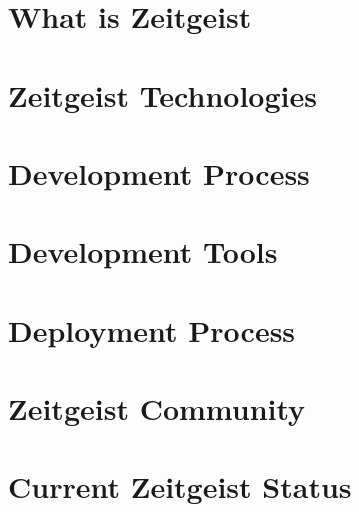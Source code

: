 \documentclass[10pt]{book}
\begin{document}


\tableofcontents

\chapter{What is Zeitgeist}


\chapter{Zeitgeist Technologies}


\chapter{Development Process}


\chapter{Development Tools}


\chapter{Deployment Process}


\chapter{Zeitgeist Community}


\chapter{Current Zeitgeist Status}

\end{document}
